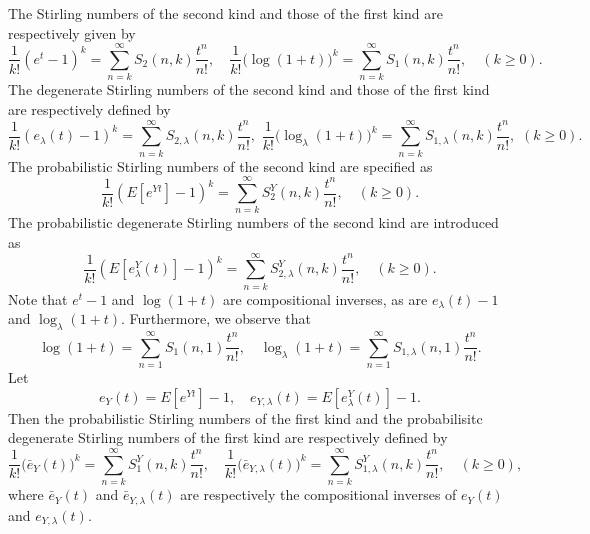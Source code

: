 \documentclass[a4paper,11pt]{amsart}
\begin{document}
The Stirling numbers of the second kind and those of the first kind are respectively given by
\begin{equation*}
\frac{1}{k!}(e^{t}-1)^{k}=\sum_{n=k}^{\infty}S_{2}(n,k)\frac{t^{n}}{n!}, \quad
\frac{1}{k!}\big(\log(1+t)\big)^{k}=\sum_{n=k}^{\infty}S_{1}(n,k)\frac{t^{n}}{n!},\quad (k \ge 0).
\end{equation*}
The degenerate Stirling numbers of the second kind and those of the first kind are respectively defined by
\begin{equation*}
\frac{1}{k!}(e_{\lambda}(t)-1)^{k}=\sum_{n=k}^{\infty}S_{2,\lambda}(n,k)\frac{t^{n}}{n!}, \,\,
\frac{1}{k!}\big(\log_{\lambda}(1+t)\big)^{k}=\sum_{n=k}^{\infty}S_{1,\lambda}(n,k)\frac{t^{n}}{n!},\,\, (k \ge 0).
\end{equation*}
The probabilistic Stirling numbers of the second kind are specified as
\begin{equation*}
\frac{1}{k!}(E[e^{Yt}]-1)^{k}=\sum_{n=k}^{\infty}S_{2}^{Y}(n,k)\frac{t^{n}}{n!},\quad (k \ge 0).
\end{equation*}
The probabilistic degenerate Stirling numbers of the second kind are introduced as
\begin{equation*}
\frac{1}{k!}(E[e_{\lambda}^{Y}(t)]-1)^{k}=\sum_{n=k}^{\infty}S_{2,\lambda}^{Y}(n,k)\frac{t^{n}}{n!},\quad (k \ge 0).
\end{equation*}
Note that $e^{t}-1$ and $\log(1+t)$ are compositional inverses, as are $e_{\lambda}(t)-1$ and $\log_{\lambda}(1+t)$.
Furthermore, we observe that
\begin{equation*}
\log(1+t)=\sum_{n=1}^{\infty}S_{1}(n,1)\frac{t^{n}}{n!},\quad
\log_{\lambda}(1+t)=\sum_{n=1}^{\infty}S_{1,\lambda}(n,1)\frac{t^{n}}{n!}.
\end{equation*}
Let  
\begin{equation*}
e_{Y}(t)=E[e^{Y t}]-1, \quad e_{Y, \lambda}(t)=E[e_{\lambda}^{Y}(t)]-1. 
\end{equation*}
Then the probabilistic Stirling numbers of the first kind and the probabilisitc degenerate Stirling numbers of the first kind are respectively defined by
\begin{equation*}
\frac{1}{k!}\big(\bar{e}_{Y}(t)\big)^{k}=\sum_{n=k}^{\infty}S_{1}^{Y}(n,k)\frac{t^{n}}{n!},\quad \frac{1}{k!}\big(\bar{e}_{Y,\lambda}(t)\big)^{k}=\sum_{n=k}^{\infty}S_{1,\lambda}^{Y}(n,k)\frac{t^{n}}{n!},\quad (k \ge 0),
\end{equation*}
where $\bar{e}_{Y}(t)$ and $\bar{e}_{Y,\lambda}(t)$ are respectively the compositional inverses of $e_{Y}(t)$ and $e_{Y,\lambda}(t)$. \par
\end{document}
